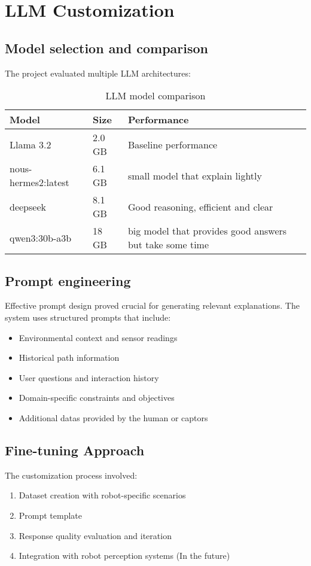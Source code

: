 \section{LLM Customization}

\subsection{Model selection and comparison}

The project evaluated multiple LLM architectures:

\begin{table}[ht]
\centering
\begin{tabular}{|l|l|l|}
\hline
\textbf{Model} & \textbf{Size} & \textbf{Performance} \\
\hline
Llama 3.2 & 2.0 GB & Baseline performance \\
nous-hermes2:latest & 6.1 GB & small model that explain lightly \\
deepseek & 8.1 GB & Good reasoning, efficient and clear\\
qwen3:30b-a3b & 18 GB & big model that provides good answers but take some time \\
\hline
\end{tabular}
\caption{LLM model comparison}
\end{table}

\subsection{Prompt engineering}

Effective prompt design proved crucial for generating relevant explanations. The system uses structured prompts that include:
\begin{itemize}
    \item Environmental context and sensor readings
    \item Historical path information
    \item User questions and interaction history
    \item Domain-specific constraints and objectives
    \item Additional datas provided by the human or captors
\end{itemize}

\subsection{Fine-tuning Approach}

The customization process involved:
\begin{enumerate}
    \item Dataset creation with robot-specific scenarios
    \item Prompt template
    \item Response quality evaluation and iteration
    \item Integration with robot perception systems (In the future)
\end{enumerate}

